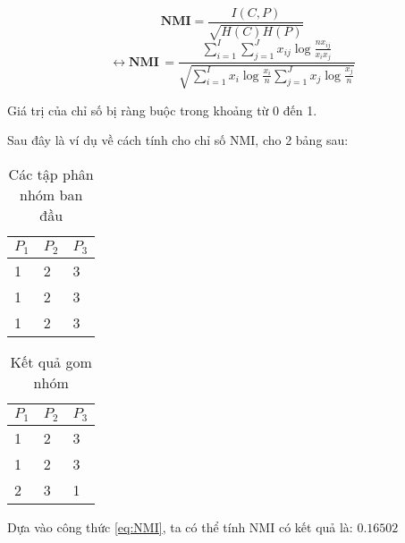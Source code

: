 \begin{center}
\begin{equation}
\textbf{NMI} = \frac{I(C,P)}{\sqrt{H(C)H(P)}}
\end{equation}
\begin{equation} \label{eq:NMI}
\longleftrightarrow \textbf{NMI} \, = \frac{\sum^I_{i=1} \sum^J_{j=1} x_{ij} \log \frac{n x_{ij}}{x_i x_j}}{\sqrt{\sum^I_{i=1} x_i \log \frac{x_i}{n} \sum^J_{j=1} x_j \log \frac{x_j}{n}}}
\end{equation}
\end{center}

Giá trị của chỉ số bị ràng buộc trong khoảng từ 0 đến 1.

Sau đây là ví dụ về cách tính cho chỉ số NMI, cho 2 bảng sau:
\begin{table}[ht]
\begin{center}
\begin{tabularx}{\textwidth}{|Y|Y|Y|}
\hline
$P_1$ & $P_2$ & $P_3$ \\
 & 2 & 3\\

1 & 2 & 3\\

1 & 2 & 3\\
\hline
\end{tabularx}
\caption[Các tập phân nhóm ban đầu]{Các tập phân nhóm ban đầu}
\label{bang_4_3}
\end{center}
\end{table}

\begin{table}[ht]
\begin{center}
\begin{tabularx}{\textwidth}{|Y|Y|Y|}
\hline
$P_1$ & $P_2$ & $P_3$\\
 & 2 & 3\\

1 & 2 & 3\\

2 & 3 & 1\\
\hline
\end{tabularx}
\caption[Kết quả gom nhóm]{Kết quả gom nhóm}
\label{bang_4_4}
\end{center}
\end{table}

Dựa vào công thức \ref{eq:NMI}, ta có thể tính NMI có kết quả là: $0.16502$

